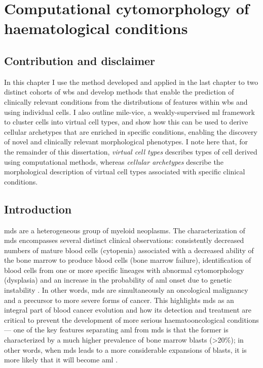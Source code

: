 \chapter{Computational cytomorphology of haematological conditions}

\section{Contribution and disclaimer}

In this chapter I use the method developed and applied in the last chapter to two distinct cohorts of \ac{wbs} and develop methods that enable the prediction of clinically relevant conditions from the distributions of features within \ac{wbs} and using individual cells. I also outline \ac{mile-vice}, a weakly-supervised \ac{ml} framework to cluster cells into virtual cell types, and show how this can be used to derive cellular archetypes that are enriched in specific conditions, enabling the discovery of novel and clinically relevant morphological phenotypes. I note here that, for the remainder of this dissertation, \textit{virtual cell types} describes types of cell derived using computational methods, whereas \textit{cellular archetypes} describe the morphological description of virtual cell types associated with specific clinical conditions.

\section{Introduction}

\ac{mds} are a heterogeneous group of myeloid neoplasms. The characterization of \ac{mds} encompasses several distinct clinical observations: consistently decreased numbers of mature blood cells (cytopenia) associated with a decreased ability of the bone marrow to produce blood cells (bone marrow failure), identification of blood cells from one or more specific lineages with abnormal cytomorphology (dysplasia) and an increase in the probability of \ac{aml} onset due to genetic instability \cite{Valent2017-uh,Hofmann2005-vv,Aster2020-cu}. In other words, \ac{mds} are simultaneously an oncological malignancy and a precursor to more severe forms of cancer. This highlights \ac{mds} as an integral part of blood cancer evolution and how its detection and treatment are critical to prevent the development of more serious haematooncological conditions --- one of the key features separating \ac{aml} from \ac{mds} is that the former is characterized by a much higher prevalence of bone marrow blasts (>20\%); in other words, when \ac{mds} leads to a more considerable expansions of blasts, it is more likely that it will become \ac{aml} \cite{Klepin2016-xg}.

